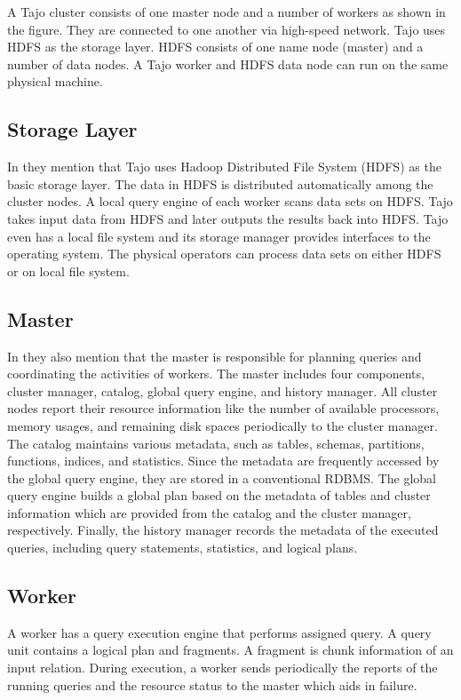 \documentclass[9pt,twocolumn,twoside]{styles/osajnl}
\begin{document}
\cite{tajo-paper} A Tajo cluster consists of one master node and a
number of workers as shown in the figure. They are connected to one
another via high-speed network. Tajo uses HDFS as the storage
layer. HDFS consists of one name node (master) and a number of data
nodes. A Tajo worker and HDFS data node can run on the same physical
machine.

\subsection{Storage Layer}
In \cite{tajo-paper} they mention that Tajo uses Hadoop Distributed
File System (HDFS) as the basic storage layer. The data in HDFS is
distributed automatically among the cluster nodes. A local query
engine of each worker scans data sets on HDFS. Tajo takes input data
from HDFS and later outputs the results back into HDFS. Tajo even has
a local file system and its storage manager provides interfaces to the
operating system. The physical operators can process data sets on
either HDFS or on local file system.

\subsection{Master}

 In \cite{tajo-paper} they also mention that the master is responsible
 for planning queries and coordinating the activities of workers. The
 master includes four components, cluster manager, catalog, global
 query engine, and history manager. All cluster nodes report their
 resource information like the number of available processors, memory
 usages, and remaining disk spaces periodically to the cluster
 manager. The catalog maintains various metadata, such as tables,
 schemas, partitions, functions, indices, and statistics. Since the
 metadata are frequently accessed by the global query engine, they are
 stored in a conventional RDBMS. The global query engine builds a
 global plan based on the metadata of tables and cluster information
 which are provided from the catalog and the cluster manager,
 respectively. Finally, the history manager records the metadata of
 the executed queries, including query statements, statistics, and
 logical plans.

\subsection{Worker}

A worker has a query execution engine that performs assigned query. A
query unit contains a logical plan and fragments. A fragment is chunk
information of an input relation. During execution, a worker sends
periodically the reports of the running queries and the resource
status to the master which aids in failure.
\end{document}
